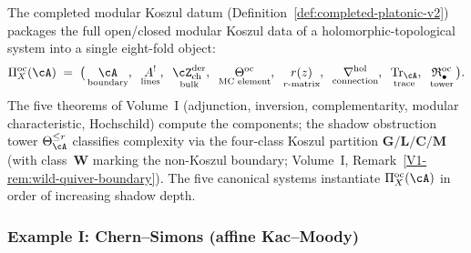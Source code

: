 The completed modular Koszul datum
(Definition~\ref{def:completed-platonic-v2})
packages the full open/closed modular Koszul data of a
holomorphic-topological system into a single eight-fold object:
\[
\Pi^{\mathrm{oc}}_X(\cA)
\;=\;
\bigl(\,
\underset{\text{boundary}}{\cA},\;\;
\underset{\text{lines}}{A^!},\;\;
\underset{\text{bulk}}{\cZ^{\mathrm{der}}_{\mathrm{ch}}},\;\;
\underset{\text{MC element}}{\Theta^{\mathrm{oc}}},\;\;
\underset{\text{$r$-matrix}}{r(z)},\;\;
\underset{\text{connection}}{\nabla^{\mathrm{hol}}},\;\;
\underset{\text{trace}}{\mathrm{Tr}_\cA},\;\;
\underset{\text{tower}}{\mathfrak{R}^{\mathrm{oc}}_\bullet}
\,\bigr).
\]
The five theorems of Volume~I (adjunction, inversion,
complementarity, modular characteristic, Hochschild) compute the
components; the shadow obstruction tower
$\Theta_\cA^{\le r}$ classifies complexity via the
four-class Koszul partition $\mathbf{G}/\mathbf{L}/\mathbf{C}/\mathbf{M}$
(with class~$\mathbf{W}$ marking the non-Koszul boundary;
Volume~I, Remark~\ref*{V1-rem:wild-quiver-boundary}).
The five canonical systems instantiate $\Pi^{\mathrm{oc}}_X(\cA)$ in order of increasing shadow depth.

\subsubsection{Example I: Chern--Simons (affine Kac--Moody)}
\label{subsubsec:platonic-CS}

